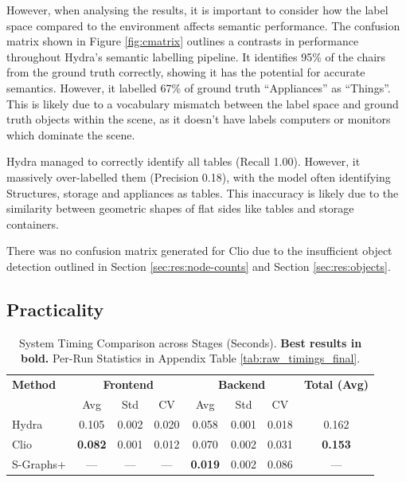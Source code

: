However, when analysing the results, it is important to consider how the label space compared to the environment affects semantic performance. The confusion matrix shown in Figure \ref{fig:cmatrix} outlines a contrasts in performance throughout Hydra’s semantic labelling pipeline. It identifies 95\% of the chairs from the ground truth correctly, showing it has the potential for accurate semantics. However, it labelled 67\% of ground truth “Appliances” as “Things”. This is likely due to a vocabulary mismatch between the label space and ground truth objects within the scene, as it doesn’t have labels computers or monitors which dominate the scene.

Hydra managed to correctly identify all tables (Recall 1.00). However, it massively over-labelled them (Precision 0.18), with the model often identifying Structures, storage and appliances as tables. This inaccuracy is likely due to the similarity between geometric shapes of flat sides like tables and storage containers.

There was no confusion matrix generated for Clio due to the insufficient object detection outlined in Section \ref{sec:res:node-counts} and Section \ref{sec:res:objects}.

\subsection{Practicality}\label{sec:res:practicality}

\begin{table}[H]
\centering
\caption{System Timing Comparison across Stages (Seconds). \textbf{Best results in bold.} Per-Run Statistics in Appendix Table \ref{tab:raw_timings_final}.}
\label{tab:timing_transposed}
\begin{tabular}{l | ccc | ccc | c}
\toprule
\textbf{Method} & \multicolumn{3}{c|}{\textbf{Frontend}} & \multicolumn{3}{c|}{\textbf{Backend}} & \textbf{Total (Avg)} \\
 & Avg & Std & CV & Avg & Std & CV & \\
\midrule
Hydra    & 0.105 & 0.002 & 0.020 & 0.058 & 0.001 & 0.018 & 0.162 \\
Clio     & \textbf{0.082} & 0.001 & 0.012 & 0.070 & 0.002 & 0.031 & \textbf{0.153} \\
S-Graphs+ & --- & --- & --- & \textbf{0.019} & 0.002 & 0.086 & --- \\
\bottomrule
\end{tabular}
\end{table}

